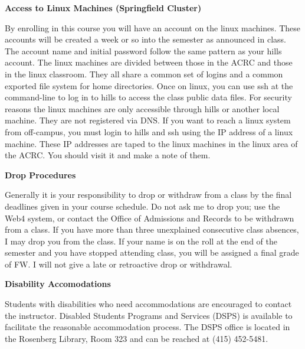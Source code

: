 \documentclass[11pt]{article}
\begin{document}
\hspace{3mm}

\textbf{Access to Linux Machines (Springfield Cluster)}

\hspace{3mm}

By enrolling in this course you will have an account on the linux machines.
These accounts will be created a week or so into the semester as announced in
class. The account name and initial password follow the same pattern as your
hills account. The linux machines are divided between those in the ACRC and
those in the linux classroom. They all share a common set of logins and a
common exported file system for home directories. Once on linux, you can use
ssh at the command-line to log in to hills to access the class public data
files.  For security reasons the linux machines are only accessible through
hills or another local machine. They are not registered via DNS. If you want to
reach a linux system from off-campus, you must login to hills and ssh using the
IP address of a linux machine. These IP addresses are taped to the linux
machines in the linux area of the ACRC. You should visit it and make a note of
them.

\hspace{3mm}

\textbf{Drop Procedures}

\hspace{3mm}

Generally it is your responsibility to drop or withdraw from a class by the
final deadlines given in your course schedule. Do not ask me to drop you; use
the Web4 system, or contact the Office of Admissions and Records to be
withdrawn from a class. If you have more than three unexplained consecutive
class absences, I may drop you from the class. If your name is on the roll at
the end of the semester and you have stopped attending class, you will be
assigned a final grade of FW. I will not give a late or retroactive drop or
withdrawal.

\hspace{3mm}

\textbf{Disability Accomodations}

\hspace{3mm}

Students with disabilities who need accommodations are encouraged to contact
the instructor. Disabled Students Programs and Services (DSPS) is available to
facilitate the reasonable accommodation process. The DSPS office is located in
the Rosenberg Library, Room 323 and can be reached at (415) 452-5481.
\end{document}
